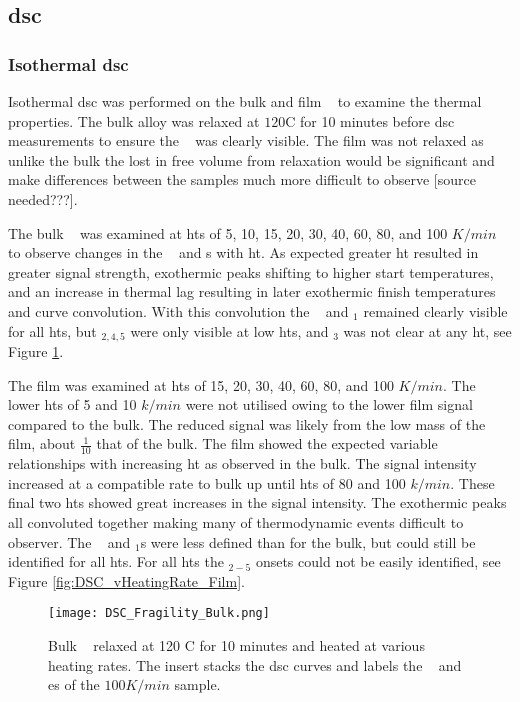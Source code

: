 \documentclass[a4paper,12pt,oneside]{article}%
\begin{document}
\subsection{\acrshort{dsc}}
\subsubsection{Isothermal \acrshort{dsc}}
Isothermal \acrshort{dsc} was performed on the bulk and film \MgZnCa~ to examine the thermal properties. The bulk alloy was relaxed at $120$\degree C for 10 minutes before \acrshort{dsc} measurements to ensure the \Tg~ was clearly visible. The film was not relaxed as unlike the bulk the lost in free volume from relaxation would be significant and make differences between the samples much more difficult to observe [source needed???]. 

The bulk \MgZnCa~ was examined at \glspl{ht} of 5, 10, 15, 20, 30, 40, 60, 80, and 100 $K/min$ to observe changes in the \Tg~ and \Tx s with \gls{ht}. As expected greater \gls{ht} resulted in greater signal strength, exothermic peaks shifting to higher start temperatures, and an increase in thermal lag resulting in later exothermic finish temperatures and curve convolution. With this convolution the \Tg~ and \Tx $_{1}$  remained clearly visible for all \glspl{ht}, but \Tx $_{2,4,5}$ were only visible at low \glspl{ht}, and \Tx $_{3}$ was not clear at any \gls{ht}, see Figure \ref{fig:DSC_vHeatingRate_Bulk}.

The film was examined at \glspl{ht} of 15, 20, 30, 40, 60, 80, and 100 $K/min$. The lower \glspl{ht} of 5 and 10 $k/min$ were not utilised owing to the lower film signal compared to the bulk. The reduced signal was likely from the low mass of the film, about $\frac{1}{10}$ that of the bulk. The film showed the expected variable relationships with increasing \gls{ht} as observed in the bulk. The signal intensity increased at a compatible rate to bulk up until \glspl{ht} of 80 and 100 $k/min$. These final two \glspl{ht} showed great increases in the signal intensity. The exothermic peaks all convoluted together making many of thermodynamic events difficult to observer. The \Tg~ and \Tx $_{1}$s were less defined than for the bulk, but could still be identified for all \glspl{ht}. For all \glspl{ht} the \Tx $_{2-5}$ onsets could not be easily identified, see Figure \ref{fig:DSC_vHeatingRate_Film}.

\begin{figure}[b]
	\centering
	\texttt{[image: DSC\_Fragility\_Bulk.png]}
	\caption[Table of contents Capition]{Bulk \MgZnCa~ relaxed at 120 \degree C for 10 minutes and heated at various heating rates. The insert stacks the \gls{dsc} curves and labels the \Tg~ and \Tx es of the $100 K/min$ sample.}%
	\label{fig:DSC_vHeatingRate_Bulk}
\end{figure}
\end{document}
